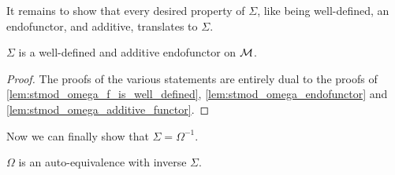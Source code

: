 It remains to show that every desired property of \( \Sigma \), like being well-defined, an endofunctor, and additive, translates to \( \Sigma \).
\begin{lemma}
    \label{lem:stmod_sigma_well-defined_additive_endofunctor}
    \( \Sigma \) is a well-defined and additive endofunctor on \( {\mathcal{M}} \).
\end{lemma}
\begin{proof}
    The proofs of the various statements are entirely dual to the proofs of \autoref{lem:stmod_omega_f_is_well_defined}, \autoref{lem:stmod_omega_endofunctor} and \autoref{lem:stmod_omega_additive_functor}.
\end{proof}

Now we can finally show that \( \Sigma = \Omega^{-1} \).

\begin{theorem}
    \( \Omega \) is an auto-equivalence with inverse \( \Sigma \).
\end{theorem}
